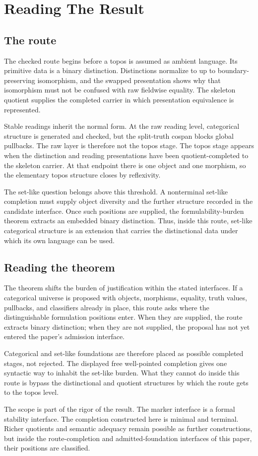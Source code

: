 \documentclass[11pt]{article}
\begin{document}
\section{Reading The Result}

\subsection*{The route}

The checked route begins before a topos is assumed as ambient language.
Its primitive data is a binary distinction.  Distinctions normalize to
 up to boundary-preserving isomorphism, and the swapped
presentation shows why that isomorphism must not be confused with raw
fieldwise equality.  The skeleton quotient supplies the completed
carrier in which presentation equivalence is represented.

Stable readings inherit the normal form.  At the raw reading level,
categorical structure is generated and checked, but the split-truth
cospan blocks global pullbacks.  The raw layer is therefore not the
topos stage.  The topos stage appears when the distinction and reading
presentations have been quotient-completed to the skeleton carrier.  At
that endpoint there is one object and one morphism, so the elementary
topos structure closes by reflexivity.

The set-like question belongs above this threshold.  A nonterminal
set-like completion must supply object diversity and the further
structure recorded in the candidate interface.  Once such positions are
supplied, the formulability-burden theorem extracts an embedded binary
distinction.  Thus, inside this route, set-like categorical structure is
an extension that carries the distinctional data under which its own
language can be used.

\subsection*{Reading the theorem}

The theorem shifts the burden of justification within the stated
interfaces.  If a categorical universe is proposed with objects,
morphisms, equality, truth values, pullbacks, and classifiers already in
place, this route asks where the distinguishable formulation positions
enter.  When they are supplied, the route extracts binary distinction;
when they are not supplied, the proposal has not yet entered the paper's
admission interface.

Categorical and set-like foundations are therefore placed as possible
completed stages, not rejected.  The displayed free well-pointed
completion gives one syntactic way to inhabit the set-like burden.  What
they cannot do inside this route is bypass the distinctional and quotient
structures by which the route gets to the topos level.

The scope is part of the rigor of the result.  The marker interface is a
formal stability interface.  The completion constructed here is minimal
and terminal.  Richer quotients and semantic adequacy remain possible as
further constructions, but inside the route-completion and
admitted-foundation interfaces of this paper, their positions are
classified.
\end{document}
